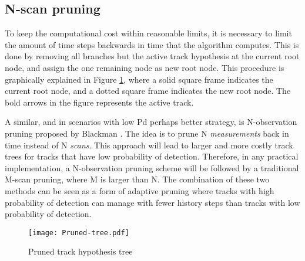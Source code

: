 \subsection{N-scan pruning}
To keep the computational cost within reasonable limits, it is necessary to limit the amount of time steps backwards in time that the algorithm computes. This is done by removing all branches but the active track hypothesis at the current root node, and assign the one remaining node as new root node. This procedure is graphically explained in Figure \ref{fig:pruned-hyp-tree}, where a solid square frame indicates the current root node, and a dotted square frame indicates the new root node. The bold arrows in the figure represents the active track.

A similar, and in scenarios with low \gls{Pd} perhaps better strategy, is N-\gls{observation} pruning proposed by Blackman \cite{Blackman2004}. The idea is to prune N \emph{measurements} back in time instead of N \emph{scans}. This approach will lead to larger and more costly track trees for tracks that have low probability of detection. Therefore, in any practical implementation, a N-observation pruning scheme will be followed by a traditional M-scan pruning, where M is larger than N. The combination of these two methods can be seen as a form of adaptive pruning where tracks with high probability of detection can manage with fewer history steps than tracks with low probability of detection.

\begin{figure}[ht]
\centering
\texttt{[image: Pruned-tree.pdf]}
\caption{Pruned track hypothesis tree}
\label{fig:pruned-hyp-tree}
\end{figure}